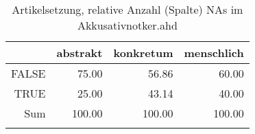 \begin{table}[ht]
\centering
\begin{tabular}{rrrr}
  \lsptoprule
 & abstrakt & konkretum & menschlich \\ 
  \midrule
FALSE & 75.00 & 56.86 & 60.00 \\ 
  TRUE & 25.00 & 43.14 & 40.00 \\ 
  Sum & 100.00 & 100.00 & 100.00 \\ 
   \lspbottomrule
\end{tabular}
\caption{Artikelsetzung, relative Anzahl (Spalte) NAs im Akkusativnotker.ahd} 
\end{table}
